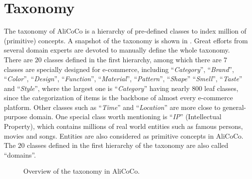 \section{Taxonomy}
\label{sec:taxonomy}


The taxonomy of AliCoCo is a hierarchy of pre-defined classes
to index million of (primitive) concepts.
A snapshot of the taxonomy is shown in .
Great efforts from several domain experts are devoted to manually define the whole taxonomy.
There are $20$ classes defined in the first hierarchy, 
among which there are $7$ classes are specially designed for e-commerce, including ``\textit{Category}'', ``\textit{Brand}'', ``\textit{Color}'', ``\textit{Design}'',
``\textit{Function}'', ``\textit{Material}'',
``\textit{Pattern}'', ``\textit{Shape}''
``\textit{Smell}'', ``\textit{Taste}'' and 
``\textit{Style}'',
where the largest one is ``\textit{Category}'' having nearly $800$ leaf classes, since the categorization of items is the backbone of almost every e-commerce platform.
Other classes such as ``\textit{Time}'' and  ``\textit{Location}'' are more close to general-purpose domain.
One special class worth mentioning is ``\textit{IP}'' (Intellectual Property), 
which contains millions of real world entities such as famous persons, movies and songs.
Entities are also considered as primitive concepts in AliCoCo.
The $20$ classes defined in the first hierarchy of the taxonomy are also called ``domains''.

\begin{figure}[th]
	\centering
	\caption{Overview of the taxonomy in AliCoCo.}
	\label{fig:primitive}
\end{figure}